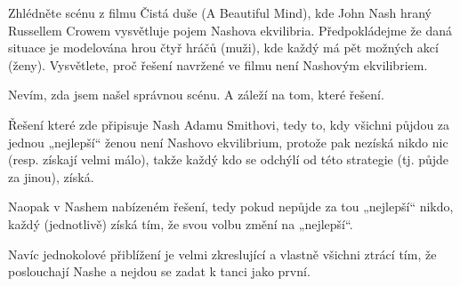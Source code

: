 \documentclass[12pt]{article}					%
\begin{document}
\begin{priklad}[1.2]
	Zhlédněte scénu z filmu Čistá duše (A Beautiful Mind), kde John Nash hraný Russellem Crowem vysvětluje pojem Nashova ekvilibria. Předpokládejme že daná situace je modelována hrou čtyř hráčů (muži), kde každý má pět možných akcí (ženy). Vysvětlete, proč řešení navržené ve filmu není Nashovým ekvilibriem.

	\begin{reseni}
		Nevím, zda jsem našel správnou scénu. A záleží na tom, které řešení.

		Řešení které zde připisuje Nash Adamu Smithovi, tedy to, kdy všichni půjdou za jednou „nejlepší“ ženou není Nashovo ekvilibrium, protože pak nezíská nikdo nic (resp. získají velmi málo), takže každý kdo se odchýlí od této strategie (tj. půjde za jinou), získá.

		Naopak v Nashem nabízeném řešení, tedy pokud nepůjde za tou „nejlepší“ nikdo, každý (jednotlivě) získá tím, že svou volbu změní na „nejlepší“.

		Navíc jednokolové přiblížení je velmi zkreslující a vlastně všichni ztrácí tím, že poslouchají Nashe a nejdou se zadat k tanci jako první.
	\end{reseni}
\end{priklad}
\end{document}
